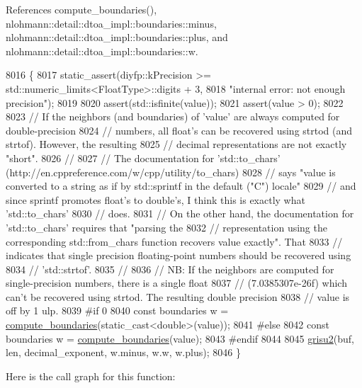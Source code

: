 References compute\+\_\+boundaries(), nlohmann\+::detail\+::dtoa\+\_\+impl\+::boundaries\+::minus, nlohmann\+::detail\+::dtoa\+\_\+impl\+::boundaries\+::plus, and nlohmann\+::detail\+::dtoa\+\_\+impl\+::boundaries\+::w.


\begin{DoxyCode}
8016 \{
8017     static\_assert(diyfp::kPrecision >= std::numeric\_limits<FloatType>::digits + 3,
8018                   \textcolor{stringliteral}{"internal error: not enough precision"});
8019 
8020     assert(std::isfinite(value));
8021     assert(value > 0);
8022 
8023     \textcolor{comment}{// If the neighbors (and boundaries) of 'value' are always computed for double-precision}
8024     \textcolor{comment}{// numbers, all float's can be recovered using strtod (and strtof). However, the resulting}
8025     \textcolor{comment}{// decimal representations are not exactly "short".}
8026     \textcolor{comment}{//}
8027     \textcolor{comment}{// The documentation for 'std::to\_chars' (http://en.cppreference.com/w/cpp/utility/to\_chars)}
8028     \textcolor{comment}{// says "value is converted to a string as if by std::sprintf in the default ("C") locale"}
8029     \textcolor{comment}{// and since sprintf promotes float's to double's, I think this is exactly what 'std::to\_chars'}
8030     \textcolor{comment}{// does.}
8031     \textcolor{comment}{// On the other hand, the documentation for 'std::to\_chars' requires that "parsing the}
8032     \textcolor{comment}{// representation using the corresponding std::from\_chars function recovers value exactly". That}
8033     \textcolor{comment}{// indicates that single precision floating-point numbers should be recovered using}
8034     \textcolor{comment}{// 'std::strtof'.}
8035     \textcolor{comment}{//}
8036     \textcolor{comment}{// NB: If the neighbors are computed for single-precision numbers, there is a single float}
8037     \textcolor{comment}{//     (7.0385307e-26f) which can't be recovered using strtod. The resulting double precision}
8038     \textcolor{comment}{//     value is off by 1 ulp.}
8039 \textcolor{preprocessor}{#if 0}
8040     \textcolor{keyword}{const} boundaries w = \hyperlink{namespacenlohmann_1_1detail_1_1dtoa__impl_a22b6e37654ac93c6d0d9c06ec1bf5ded}{compute\_boundaries}(static\_cast<double>(value));
8041 \textcolor{preprocessor}{#else}
8042     \textcolor{keyword}{const} boundaries w = \hyperlink{namespacenlohmann_1_1detail_1_1dtoa__impl_a22b6e37654ac93c6d0d9c06ec1bf5ded}{compute\_boundaries}(value);
8043 \textcolor{preprocessor}{#endif}
8044 
8045     \hyperlink{namespacenlohmann_1_1detail_1_1dtoa__impl_aab7a9670a4f4704a5d0347ad7588576b}{grisu2}(buf, len, decimal\_exponent, w.minus, w.w, w.plus);
8046 \}
\end{DoxyCode}
Here is the call graph for this function\+:
\mbox{\label{namespacenlohmann_1_1detail_1_1dtoa__impl_a9b899c72b0e1e3dd46d75c2b4e6bcdfb}} 
